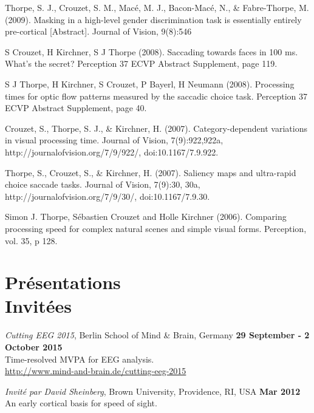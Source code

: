 \documentclass[margin,line]{resume}
\begin{document}
\begin{resume}
	\vspace{-2mm} Thorpe, S. J., Crouzet, S. M., Macé, M. J., Bacon-Macé, N., \& Fabre-Thorpe, M. (2009). Masking in a high-level gender discrimination task is essentially entirely pre-cortical [Abstract]. Journal of Vision, 9(8):546

	\vspace{-2mm} S Crouzet, H Kirchner, S J Thorpe (2008). Saccading towards faces in 100 ms. What's the secret? Perception 37 ECVP Abstract Supplement, page 119. 
	
	\vspace{-2mm} S J Thorpe, H Kirchner, S Crouzet, P Bayerl, H Neumann (2008). Processing times for optic flow patterns measured by the saccadic choice task. Perception 37 ECVP Abstract Supplement, page 40.

	\vspace{-2mm} Crouzet, S., Thorpe, S. J., \& Kirchner, H. (2007). Category-dependent variations in visual processing time. Journal of Vision, 7(9):922,922a, http://journalofvision.org/7/9/922/, doi:10.1167/7.9.922.

	\vspace{-2mm} Thorpe, S., Crouzet, S., \& Kirchner, H. (2007). Saliency maps and ultra-rapid choice saccade tasks. Journal of Vision, 7(9):30, 30a, http://journalofvision.org/7/9/30/, doi:10.1167/7.9.30.

	\vspace{-2mm} Simon J. Thorpe, Sébastien Crouzet and Holle Kirchner (2006). Comparing processing speed for complex natural scenes and simple visual forms. Perception, vol. 35, p 128.

	\normalsize

\vspace{3mm}
\section{\mysidestyle Présentations\\Invitées}
    
	\footnotesize

	\textit{Cutting EEG 2015}, Berlin School of Mind \& Brain, Germany \hfill \textbf{29 September - 2 October 2015}\\
	Time-resolved MVPA for EEG analysis. \\
	\url{http://www.mind-and-brain.de/cutting-eeg-2015}
	
	\vspace{-2mm} 
	\textit{Invité par David Sheinberg}, Brown University, Providence, RI, USA \hfill \textbf{Mar 2012}\\
	An early cortical basis for speed of sight. 


\end{resume}
\end{document}
